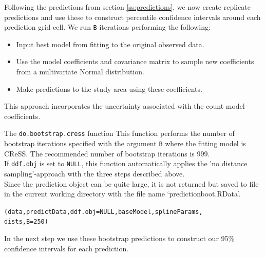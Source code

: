 \noindent Following the predictions from section \ref{ss:predictions}, we now create replicate predictions and use these to construct percentile confidence intervals around each prediction grid cell. We run {\tt B} iterations performing the following: 
\begin{itemize}
\item Input best model from fitting to the original observed data.
\item{Use the model coefficients and covariance matrix to sample new coefficients from a multivariate Normal distribution.}
\item{Make predictions to the study area using these coefficients.}
\end{itemize}
This approach incorporates the uncertainty associated with the count model coefficients. 

\begin{block}{The {\tt do.bootstrap.cress} function}
This function performs the number of bootstrap iterations specified with the argument {\tt B} where the fitting model is CReSS. The recommended number of bootstrap iterations is 999. \\

If {\tt ddf.obj} is set to {\tt NULL}, this function automatically applies the 'no distance sampling'-approach with the three steps described above.\\

Since the prediction object can be quite large, it is not returned but saved to file in the current working directory with the file name `predictionboot.RData'.  
\end{block}

\begin{knitrout}\footnotesize
{}\color{fgcolor}\begin{kframe}
\begin{alltt}
(data, predictData, ddf.obj=NULL, baseModel, splineParams, 
                dists, B=250)
\end{alltt}
\end{kframe}
\end{knitrout}

\noindent In the next step we use these bootstrap predictions to construct our 95\% confidence intervals for each prediction. 

